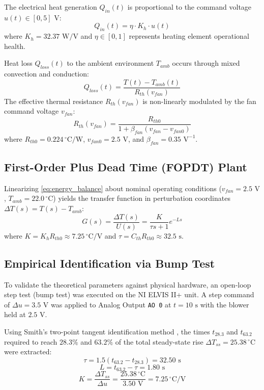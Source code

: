 \documentclass[conference]{IEEEtran}
\begin{document}
The electrical heat generation $Q_{in}(t)$ is proportional to the command voltage $u(t) \in [0, 5]\text{ V}$:
\begin{equation}
Q_{in}(t) = \eta \cdot K_h \cdot u(t)
\end{equation}
where $K_h = 32.37\text{ W/V}$ and $\eta \in [0, 1]$ represents heating element operational health.

Heat loss $Q_{loss}(t)$ to the ambient environment $T_{amb}$ occurs through mixed convection and conduction:
\begin{equation}
Q_{loss}(t) = \frac{T(t) - T_{amb}(t)}{R_{th}(v_{fan})}
\end{equation}
The effective thermal resistance $R_{th}(v_{fan})$ is non-linearly modulated by the fan command voltage $v_{fan}$:
\begin{equation}
R_{th}(v_{fan}) = \frac{R_{th0}}{1 + \beta_{fan}(v_{fan} - v_{fan0})}
\end{equation}
where $R_{th0} = 0.224\,^\circ\text{C/W}$, $v_{fan0} = 2.5\text{ V}$, and $\beta_{fan} = 0.35\text{ V}^{-1}$.

\subsection{First-Order Plus Dead Time (FOPDT) Plant}
Linearizing \eqref{eq:energy_balance} about nominal operating conditions ($v_{fan} = 2.5\text{ V}$, $T_{amb} = 22.0\,^\circ\text{C}$) yields the transfer function in perturbation coordinates $\Delta T(s) = T(s) - T_{amb}$:
\begin{equation}
G(s) = \frac{\Delta T(s)}{U(s)} = \frac{K}{\tau s + 1} e^{-L s}
\label{eq:fopdt}
\end{equation}
where $K = K_h R_{th0} \approx 7.25\,^\circ\text{C/V}$ and $\tau = C_{th} R_{th0} \approx 32.5\text{ s}$.

\subsection{Empirical Identification via Bump Test}
To validate the theoretical parameters against physical hardware, an open-loop step test (bump test) was executed on the NI ELVIS II+ unit. A step command of $\Delta u = 3.5\text{ V}$ was applied to Analog Output \texttt{AO 0} at $t = 10\text{ s}$ with the blower held at $2.5\text{ V}$. 

Using Smith's two-point tangent identification method \cite{astrom2006}, the times $t_{28.3}$ and $t_{63.2}$ required to reach $28.3\%$ and $63.2\%$ of the total steady-state rise $\Delta T_{ss} = 25.38\,^\circ\text{C}$ were extracted:
\begin{equation}
\tau = 1.5 \left( t_{63.2} - t_{28.3} \right) = 32.50\text{ s}
\end{equation}
\begin{equation}
L = t_{63.2} - \tau = 1.80\text{ s}
\end{equation}
\begin{equation}
K = \frac{\Delta T_{ss}}{\Delta u} = \frac{25.38\,^\circ\text{C}}{3.50\text{ V}} = 7.25\,^\circ\text{C/V}
\end{equation}
\end{document}
